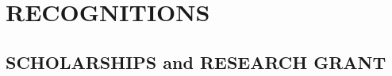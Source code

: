 \documentclass[11pt,letterpaper,sans]{moderncv}        %
\begin{document}



\section{RECOGNITIONS}

\subsection{SCHOLARSHIPS and RESEARCH GRANT}
\end{document}
